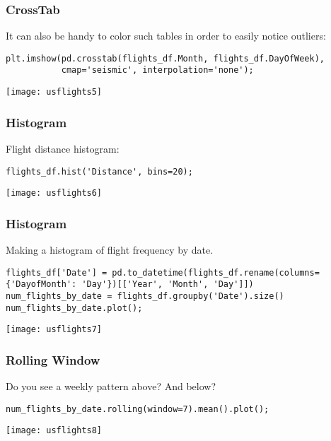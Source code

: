 \begin{frame}[fragile]\frametitle{CrossTab}	
It can also be handy to color such tables in order to easily notice outliers:
\begin{lstlisting}
plt.imshow(pd.crosstab(flights_df.Month, flights_df.DayOfWeek),
           cmap='seismic', interpolation='none');
\end{lstlisting}
\begin{center}
\texttt{[image: usflights5]}
\end{center}
\end{frame}

\begin{frame}[fragile]\frametitle{Histogram}	
Flight distance histogram:
\begin{lstlisting}
flights_df.hist('Distance', bins=20);
\end{lstlisting}
\begin{center}
\texttt{[image: usflights6]}
\end{center}
\end{frame}

\begin{frame}[fragile]\frametitle{Histogram}	
Making a histogram of flight frequency by date.
\begin{lstlisting}
flights_df['Date'] = pd.to_datetime(flights_df.rename(columns={'DayofMonth': 'Day'})[['Year', 'Month', 'Day']])
num_flights_by_date = flights_df.groupby('Date').size()
num_flights_by_date.plot();
\end{lstlisting}
\begin{center}
\texttt{[image: usflights7]}
\end{center}
\end{frame}

\begin{frame}[fragile]\frametitle{Rolling Window}	
Do you see a weekly pattern above? And below?
\begin{lstlisting}
num_flights_by_date.rolling(window=7).mean().plot();
\end{lstlisting}
\begin{center}
\texttt{[image: usflights8]}
\end{center}
\end{frame}


